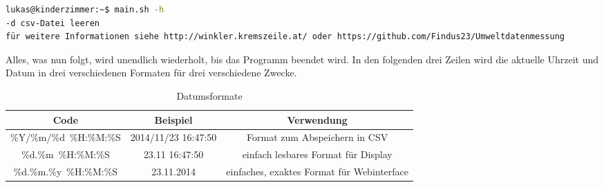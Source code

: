 \begin{lstlisting}[language=bash,style=terminal]
lukas@kinderzimmer:~$ main.sh -h
-d csv-Datei leeren 
für weitere Informationen siehe http://winkler.kremszeile.at/ oder https://github.com/Findus23/Umweltdatenmessung

\end{lstlisting}
Alles, was nun folgt, wird unendlich wiederholt, bis das Programm beendet wird. 
In den folgenden drei Zeilen wird die aktuelle Uhrzeit und Datum in drei verschiedenen Formaten für drei verschiedene Zwecke.
\begin{table}[h]
	\centering
	\begin{tabulary}{\textwidth}{C|C|C}
		Code & Beispiel & Verwendung \\
		\hline
		\hline
		\%Y/\%m/\%d\ \%H:\%M:\%S & 2014/11/23 16:47:50 & Format zum Abspeichern in \gls{CSV} \\
		\hline
		\%d.\%m\ \%H:\%M:\%S & 23.11 16:47:50 & einfach lesbares Format für Display \\
		\hline
		\%d.\%m.\%y\ \%H:\%M:\%S & 23.11.2014 & einfaches, exaktes Format für Webinterface \\
	\end{tabulary}
	\caption{Datumsformate}
\end{table}



